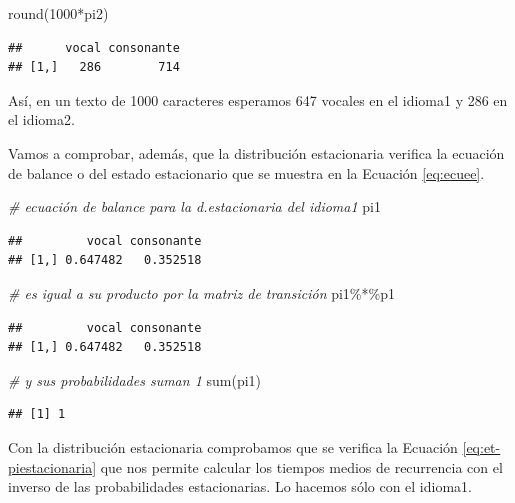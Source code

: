 \documentclass[
]{book}
\newenvironment{Shaded}{\begin{snugshade}}{\end{snugshade}}
\newcommand{\CommentTok}[1]{\textcolor[rgb]{0.56,0.35,0.01}{\textit{#1}}}
\newcommand{\DecValTok}[1]{\textcolor[rgb]{0.00,0.00,0.81}{#1}}
\newcommand{\FunctionTok}[1]{\textcolor[rgb]{0.00,0.00,0.00}{#1}}
\newcommand{\NormalTok}[1]{#1}
\newcommand{\SpecialCharTok}[1]{\textcolor[rgb]{0.00,0.00,0.00}{#1}}
\theoremstyle{definition}
\theoremstyle{definition}
\theoremstyle{definition}
\theoremstyle{definition}
\theoremstyle{remark}
\begin{document}
\begin{Shaded}
\begin{Highlighting}[]
\FunctionTok{round}\NormalTok{(}\DecValTok{1000}\SpecialCharTok{*}\NormalTok{pi2)}
\end{Highlighting}
\end{Shaded}

\begin{verbatim}
##      vocal consonante
## [1,]   286        714
\end{verbatim}

Así, en un texto de 1000 caracteres esperamos 647 vocales en el idioma1 y 286 en el idioma2.

Vamos a comprobar, además, que la distribución estacionaria verifica la ecuación de balance o del estado estacionario que se muestra en la Ecuación \eqref{eq:ecuee}.

\begin{Shaded}
\begin{Highlighting}[]
\CommentTok{\# ecuación de balance para la d.estacionaria del idioma1}
\NormalTok{pi1}
\end{Highlighting}
\end{Shaded}

\begin{verbatim}
##         vocal consonante
## [1,] 0.647482   0.352518
\end{verbatim}

\begin{Shaded}
\begin{Highlighting}[]
\CommentTok{\# es igual a su producto por la matriz de transición}
\NormalTok{pi1}\SpecialCharTok{\%*\%}\NormalTok{p1}
\end{Highlighting}
\end{Shaded}

\begin{verbatim}
##         vocal consonante
## [1,] 0.647482   0.352518
\end{verbatim}

\begin{Shaded}
\begin{Highlighting}[]
\CommentTok{\# y sus probabilidades suman 1}
\FunctionTok{sum}\NormalTok{(pi1)}
\end{Highlighting}
\end{Shaded}

\begin{verbatim}
## [1] 1
\end{verbatim}

Con la distribución estacionaria comprobamos que se verifica la Ecuación \eqref{eq:et-piestacionaria} que nos permite calcular los tiempos medios de recurrencia con el inverso de las probabilidades estacionarias. Lo hacemos sólo con el idioma1.
\end{document}
